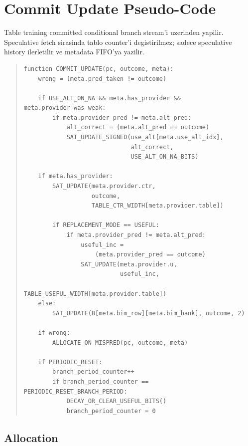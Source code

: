 \documentclass[11pt,a4paper]{article}
\begin{document}
\section{Commit Update Pseudo-Code}

Table training committed conditional branch stream'i uzerinden yapilir.
Speculative fetch sirasinda tablo counter'i degistirilmez; sadece speculative
history ilerletilir ve metadata FIFO'ya yazilir.

\begin{quote}
\footnotesize
\begin{verbatim}
function COMMIT_UPDATE(pc, outcome, meta):
    wrong = (meta.pred_taken != outcome)

    if USE_ALT_ON_NA && meta.has_provider && meta.provider_was_weak:
        if meta.provider_pred != meta.alt_pred:
            alt_correct = (meta.alt_pred == outcome)
            SAT_UPDATE_SIGNED(use_alt[meta.use_alt_idx],
                              alt_correct,
                              USE_ALT_ON_NA_BITS)

    if meta.has_provider:
        SAT_UPDATE(meta.provider.ctr,
                   outcome,
                   TABLE_CTR_WIDTH[meta.provider.table])

        if REPLACEMENT_MODE == USEFUL:
            if meta.provider_pred != meta.alt_pred:
                useful_inc =
                    (meta.provider_pred == outcome)
                SAT_UPDATE(meta.provider.u,
                           useful_inc,
                           TABLE_USEFUL_WIDTH[meta.provider.table])
    else:
        SAT_UPDATE(B[meta.bim_row][meta.bim_bank], outcome, 2)

    if wrong:
        ALLOCATE_ON_MISPRED(pc, outcome, meta)

    if PERIODIC_RESET:
        branch_period_counter++
        if branch_period_counter == PERIODIC_RESET_BRANCH_PERIOD:
            DECAY_OR_CLEAR_USEFUL_BITS()
            branch_period_counter = 0
\end{verbatim}
\end{quote}

\subsection{Allocation}
\end{document}
